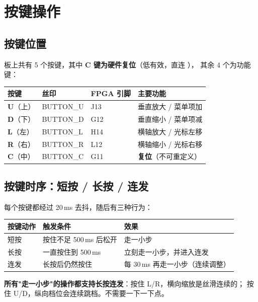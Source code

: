 \documentclass[UTF8,a4paper,11pt]{ctexart}
\begin{document}
\section{按键操作}
\label{sec:key}

\subsection{按键位置}

板上共有 5 个按键，其中 \textbf{C 键为硬件复位}（低有效，直连 ），
其余 4 个为功能键：

\begin{center}
\small
\begin{tabular}{llll}
\toprule
按键 & 丝印 & FPGA 引脚 & 主要功能\\
\midrule
\textbf{U}（上） & BUTTON\_U & J13 & 垂直放大 / 菜单项加\\
\textbf{D}（下） & BUTTON\_D & G12 & 垂直缩小 / 菜单项减\\
\textbf{L}（左） & BUTTON\_L & H14 & 横轴放大 / 光标左移\\
\textbf{R}（右） & BUTTON\_R & L12 & 横轴缩小 / 光标右移\\
\textbf{C}（中） & BUTTON\_C & G11 & \textbf{复位}（不可重定义）\\
\bottomrule
\end{tabular}
\end{center}

\subsection{按键时序：短按 / 长按 / 连发}

每个按键都经过 20\,ms 去抖，随后有三种行为：

\begin{center}
\small
\begin{tabular}{lll}
\toprule
按键动作 & 触发条件 & 效果\\
\midrule
短按 & 按住不足 500\,ms 后松开 & 走一小步\\
长按 & 一直按住到 500\,ms & 立刻走一小步，并进入连发\\
连发 & 长按后仍然按住 & 每 30\,ms 再走一小步（连续调整）\\
\bottomrule
\end{tabular}
\end{center}

\begin{tipbox}
\textbf{所有"走一小步"的操作都支持长按连发}：按住 L/R，横向缩放是丝滑连续的；
按住 U/D，纵向档位会连续跳档。不需要一下一下点。
\end{tipbox}
\end{document}
